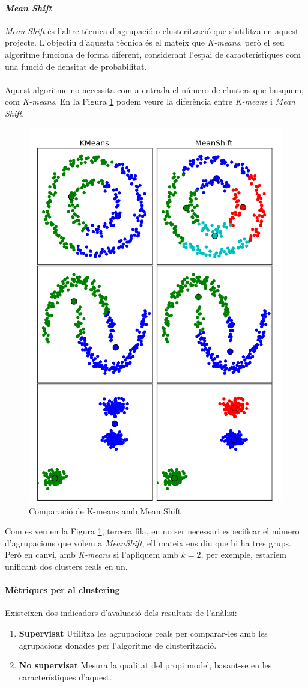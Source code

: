 \documentclass[12pt,a4paper,catalan]{article}
\begin{document}
\newpage

\paragraph{\textit{Mean Shift}}
\textit{Mean Shift} \cite{mean-shift} és l'altre tècnica d'agrupació o clusterització que s'utilitza en aquest projecte. L'objectiu d'aquesta tècnica és el mateix que \textit{K-means}, però el seu algoritme funciona de forma diferent, considerant l'espai de característiques com una funció de densitat de probabilitat.
\\
\\
Aquest algoritme no necessita com a entrada el número de clusters que busquem, com \textit{K-means}. En la Figura \ref{fig:meanshiftvskmeans} podem veure la diferència entre \textit{K-means} i \textit{Mean Shift}.

\begin{figure}[h]
\centering
\includegraphics[width=.4\linewidth]{img/kmeansVsMeanshift.png}
\caption{Comparació de K-means amb Mean Shift \cite{comp-meanshift-kmeans}}
\label{fig:meanshiftvskmeans}
\end{figure}

Com es veu en la Figura \ref{fig:meanshiftvskmeans}, tercera fila, en no ser necessari especificar el número d'agrupacions que volem a \textit{MeanShift}, ell mateix ens diu que hi ha tres grups. Però en canvi, amb \textit{K-means} si l'apliquem amb $k=2$, per exemple, estaríem unificant dos clusters reals en un.

\newpage

\paragraph{Mètriques per al clustering}
Existeixen dos indicadors d'avaluació dels resultats de l'anàlisi:
\begin{enumerate}
	\item \textbf{Supervisat} Utilitza les agrupacions reals per comparar-les amb les agrupacions donades per l'algoritme de clusterització.
	\item \textbf{No supervisat} Mesura la qualitat del propi model, basant-se en les característiques d'aquest.
\end{enumerate}
\end{document}

